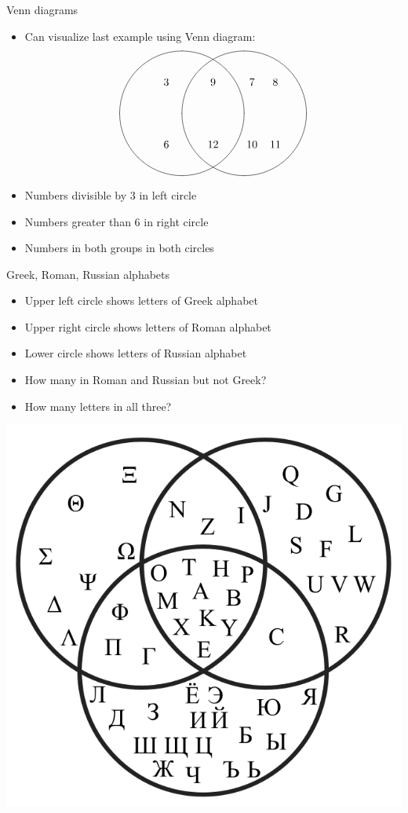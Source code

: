 \documentclass{beamer}
\theoremstyle{definition}
\begin{document}
\begin{frame}{Venn diagrams}
\begin{itemize}
\item Can visualize last example using Venn diagram:
\[\begin{xy}<1cm,0cm>:
(-1,0)*\cir<2cm>{};
(1,0)*\cir<2cm>{};
(-1.5,1)*{3};
(-1.5,-1)*{6};
(0,1)*{9};
(0,-1)*{12};
(1.25,1)*{7};
(1.25,-1)*{10};
(2,1)*{8};
(2,-1)*{11};
\end{xy}\]
\item Numbers divisible by $3$ in left circle
\item Numbers greater than $6$ in right circle
\item Numbers in both groups in both circles
\end{itemize}
\end{frame}

\begin{frame}{Greek, Roman, Russian alphabets}
\begin{multicols}{2}
\begin{itemize}
\item Upper left circle shows letters of Greek alphabet
\item Upper right circle shows letters of Roman alphabet
\item Lower circle shows letters of Russian alphabet
\item How many in Roman and Russian but not Greek?
\item How many letters in all three?
\end{itemize}
\includegraphics[scale=.25]{Venn}
\end{multicols}
\end{frame}
\end{document}
